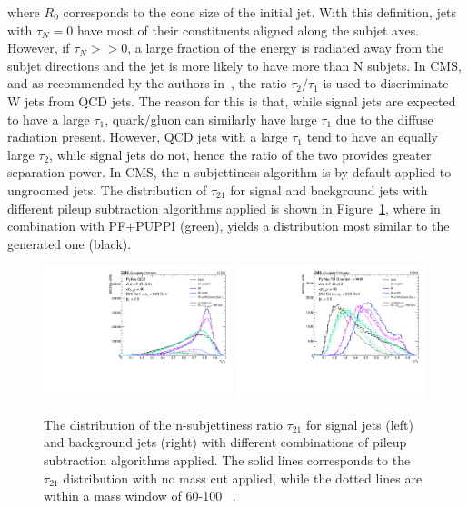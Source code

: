 where $R_0$ corresponds to the cone size of the initial jet. With this definition, jets with $\tau_N=0$ have most of their constituents aligned along the subjet axes. However, if $\tau_N>>0$, a large fraction of the energy is radiated away from the subjet directions and the jet is more likely to have more than N subjets.
In CMS, and as recommended by the authors in~\cite{Thaler:2010tr}, the ratio $\tau_2/\tau_1$ is used to discriminate W jets from QCD jets. The reason for this is that, while 
signal jets are expected to have a large $\tau_1$, quark/gluon can similarly have large $\tau_1$ due to the diffuse radiation present. However, QCD jets with a large $\tau_1$ tend to have an equally large $\tau_2$, while signal jets do not, hence the ratio of the two provides greater separation power. In CMS, the n-subjettiness algorithm is by default applied to ungroomed jets.
The distribution of $\tau_{21}$ for signal and background jets with different pileup subtraction algorithms applied is shown in Figure~\ref{fig:objreco:tau21}, where \nsubj in combination with PF+PUPPI (green), yields a distribution most similar to the generated one (black).
\begin{figure}[h] 
    \centering 
    \includegraphics[width=0.490\textwidth]{figures/event_reconstruction/sig_tau21.pdf}
    \includegraphics[width=0.490\textwidth]{figures/event_reconstruction/bkg_tau21.pdf}
     \caption{The distribution of the n-subjettiness ratio $\tau_{21}$ for signal jets (left) and background jets (right) with different combinations of pileup subtraction algorithms applied. The solid lines corresponds to the $\tau_{21}$ distribution with no mass cut applied, while the dotted lines are within a mass window of 60-100 \GeV~\cite{CMS-PAS-JME-14-001}.}
     \label{fig:objreco:tau21}
 \end{figure}

